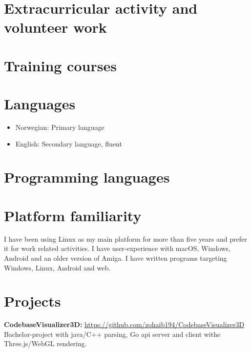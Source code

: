 \documentclass{crudecv/crudecv}
\begin{document}
\section*{Extracurricular activity and volunteer work}
\begin{experiences}
\end{experiences}

\section*{Training courses}
\begin{experiences}
\end{experiences}

\section*{Languages}
\begin{itemize}
    \item Norwegian: Primary language
    \item English: Secondary language, fluent
\end{itemize}


\section*{Programming languages}
\begin{skills}
\end{skills}


\section*{Platform familiarity}
I have been using Linux as my main platform for more than five years and prefer it for work related activities. I have user-experience with macOS, Windows, Android and an older version of Amiga. I have written programs targeting Windows, Linux, Android and web.

\section*{Projects}
\textbf{CodebaseVisualizer3D:} \hfill \href{https://github.com/zohaib194/CodebaseVisualizer3D}{https://github.com/zohaib194/CodebaseVisualizer3D} \\
Bachelor-project with java/C++ parsing, Go api server and client withe Three.js/WebGL rendering.
\end{document}
